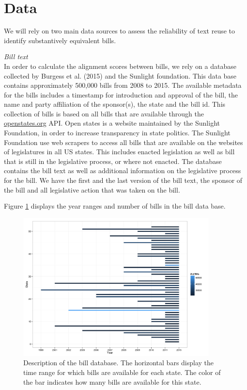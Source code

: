 \documentclass[12pt]{article} %
\begin{document}
\section{Data}

We will rely on two main data sources to assess the reliability of text reuse to
identify substantively equivalent bills. 

\textit{Bill text}\\
In order to calculate the alignment scores between bills, we rely on a database collected by Burgess et al. (2015) and the Sunlight foundation. This data base contains approximately 500,000 bills from 2008 to 2015. The available metadata for the bills includes a timestamp for introduction and approval of the bill, the name and party affiliation of the sponsor(s), the state and the bill id.  This collection of bills is based on all bills that are available through the \url{openstates.org} API. Open states is a website maintained by the Sunlight Foundation, in order to increase transparency in state politics. The Sunlight Foundation use web scrapers to access all bills that are available on the websites of legislatures in all US states. This includes enacted legislation as well as bill that is still in the legislative process, or where not enacted. The database contains the bill text as well as additional information on the legislative process for the bill. We have the first and the last version of the bill text, the sponsor of the bill and all legislative action that was taken on the bill. 

Figure \ref{fig:bill_desc} displays the year ranges and number of bills in the bill data base.

\begin{figure}[ht!]
    \centering
    \includegraphics[width=0.9\textwidth]{figures/year_count_by_state.png}
    \caption{Description of the bill database. The horizontal bars display the time range for which bills are available for each state. The color of the bar indicates how many bills are available for this state.}
    \label{fig:bill_desc}
\end{figure}
\end{document}
